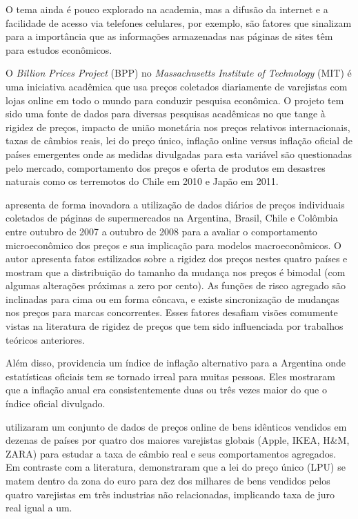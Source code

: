 \documentclass[twoside,a4paper,12pt]{report}
\begin{document}
O tema ainda é pouco explorado na academia, mas a difusão da internet e a facilidade de acesso via telefones celulares, por exemplo, são fatores que sinalizam para a importância que as informações armazenadas nas páginas de sites têm para estudos econômicos. 

O \emph{Billion Prices Project} (BPP) no \emph{Massachusetts Institute of Technology} (MIT) é uma iniciativa acadêmica que usa preços coletados diariamente de varejistas com lojas online em todo o mundo para conduzir pesquisa econômica. O projeto tem sido uma fonte de dados para diversas pesquisas acadêmicas no que tange à rigidez de preços, impacto de união monetária nos preços relativos internacionais, taxas de câmbios reais, lei do preço único, inflação online versus inflação oficial de países emergentes onde as medidas divulgadas para esta variável são questionadas pelo mercado, comportamento dos preços e oferta de produtos em desastres naturais como os terremotos do Chile em 2010 e Japão em 2011.

\citet{cavallo2010scraped} apresenta de forma inovadora a utilização de dados diários de preços individuais coletados de páginas de supermercados na Argentina, Brasil, Chile e Colômbia entre outubro de 2007 a outubro de 2008 para a avaliar o comportamento microeconômico dos preços e sua implicação para modelos macroeconômicos. O autor apresenta fatos estilizados sobre a rigidez dos preços nestes quatro países e mostram que a distribuição do tamanho da mudança nos preços é bimodal (com algumas alterações próximas a zero por cento). As funções de risco agregado são inclinadas para cima ou em forma côncava, e existe sincronização de mudanças nos preços para marcas concorrentes. Esses fatores desafiam visões comumente vistas na literatura de rigidez de preços que tem sido influenciada por trabalhos teóricos anteriores. 
  
Além disso, \citet{cavallo2010scraped} providencia um índice de inflação alternativo para a Argentina onde estatísticas oficiais tem se tornado irreal para muitas pessoas. Eles mostraram que a inflação anual era consistentemente duas ou três vezes maior do que o índice oficial divulgado. 

 \citet{cavallo2012currency} utilizaram um conjunto de dados de preços online de bens idênticos vendidos em dezenas de países por quatro dos maiores varejistas globais (Apple, IKEA, H\&M, ZARA) para estudar a taxa de câmbio real e seus comportamentos agregados. Em contraste com a literatura, demonstraram que a lei do preço único (LPU) se matem dentro da zona do euro para dez dos milhares de bens vendidos pelos quatro varejistas em três industrias não relacionadas, implicando taxa de juro real igual a um.
\end{document}
